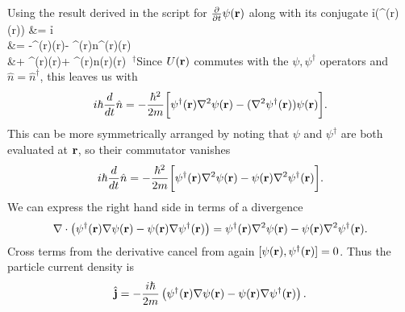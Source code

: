 \documentclass[10pt,letterpaper]{article}
\begin{document}
Using the result derived in the script for $\frac{\partial}{\partial t}\psi(\mathbf{r})$ along with its conjugate
\ba
	i\h{}(\psi^\dag(\vect r)\psi(\vect r)) &= i\h{}\\
	&= -\psi^\dag(\vect r)\psi(\vect r)-
	\psi^\dag(\vect r)\hat n^\dag(\vect r)\psi(\vect r)\\
	&\qquad + \psi^\dag(\vect r)\psi(\vect r)+
	\psi^\dag(\vect r)\hat n(\vect r)\psi(\vect r)
\ea
$\ ^\dag$Since $U(\mathbf{r})$ commutes with the $\psi,\psi^\dag$ operators and $\hat n = \hat n^\dag$, this leaves us with
\[
	i\hbar\frac{d}{dt}\hat n = -\frac{\hbar^2}{2m}\bigg[\psi^\dag(\mathbf{r})\nabla^2\psi(\mathbf{r})-(\nabla^2\psi^\dag(\mathbf{r}))\psi(\mathbf{r})\bigg].
\]
This can be more symmetrically arranged by noting that $\psi$ and $\psi^\dag$ are both evaluated at $\mathbf{r}$, 
so their commutator vanishes
\[
	i\hbar\frac{d}{dt}\hat n = -\frac{\hbar^2}{2m}\bigg[\psi^\dag(\mathbf{r})\nabla^2\psi(\mathbf{r})-\psi(\mathbf{r})\nabla^2\psi^\dag(\mathbf{r})\bigg].
\]
We can express the right hand side in terms of a divergence
\[
	\nabla\cdot \left( \psi^\dag(\mathbf{r})\nabla\psi(\mathbf{r})-\psi(\mathbf{r})\nabla\psi^\dag(\mathbf{r})\right)=
	\psi^\dag(\mathbf{r})\nabla^2\psi(\mathbf{r})-\psi(\mathbf{r})\nabla^2\psi^\dag(\mathbf{r}).
\]
Cross terms from the derivative cancel from again $[\psi(\mathbf{r}),\psi^\dag(\mathbf{r})] = 0$. Thus the particle 
current density is 
\[
	\hat{\mathbf{j}} = -\frac{i\hbar}{2m}\left( \psi^\dag(\mathbf{r})\nabla\psi(\mathbf{r})-\psi(\mathbf{r})\nabla\psi^\dag(\mathbf{r})\right).
\]
\end{document}
